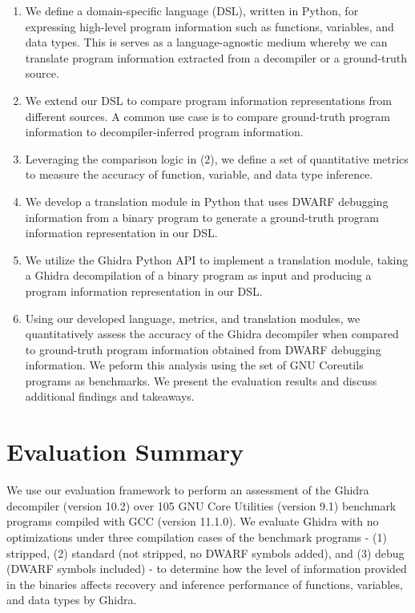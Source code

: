 \begin{enumerate}
    \item We define a domain-specific language (DSL), written in Python, for expressing high-level program information such as functions, variables, and data types. This is serves as a language-agnostic medium whereby we can translate program information extracted from a decompiler or a ground-truth source.
    \item We extend our DSL to compare program information representations from different sources. A common use case is to compare ground-truth program information to decompiler-inferred program information.
    \item Leveraging the comparison logic in (2), we define a set of quantitative metrics to measure the accuracy of function, variable, and data type inference.
    \item We develop a translation module in Python that uses DWARF debugging information from a binary program to generate a ground-truth program information representation in our DSL.
    \item We utilize the Ghidra Python API to implement a translation module, taking a Ghidra decompilation of a binary program as input and producing a program information representation in our DSL.
    \item Using our developed language, metrics, and translation modules, we quantitatively assess the accuracy of the Ghidra decompiler when compared to ground-truth program information obtained from DWARF debugging information. We peform this analysis using the set of GNU Coreutils programs as benchmarks. We present the evaluation results and discuss additional findings and takeaways.
\end{enumerate}

\section{Evaluation Summary}

We use our evaluation framework to perform an assessment of the Ghidra decompiler (version 10.2) over 105 GNU Core Utilities (version 9.1) benchmark programs compiled with GCC (version 11.1.0). We evaluate Ghidra with no optimizations under three compilation cases of the benchmark programs - (1) stripped, (2) standard (not stripped, no DWARF symbols added), and (3) debug (DWARF symbols included) - to determine how the level of information provided in the binaries affects recovery and inference performance of functions, variables, and data types by Ghidra.

